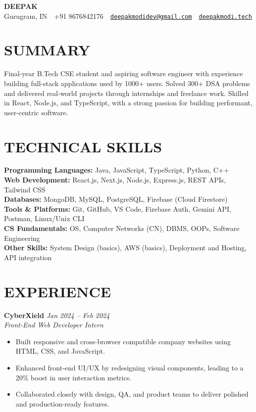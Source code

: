 \documentclass[a4paper,11pt]{article}
\begin{document}
\small
\begin{center}
    {\huge \textbf{DEEPAK}} \\
    \vspace{6pt}
    Gurugram, IN~\textbar~+91 8676842176~\textbar~\href{mailto:deepakmodidev@gmail.com}{\nolinkurl{deepakmodidev@gmail.com}}~\textbar~\href{https://deepakmodi.tech}{\texttt{deepakmodi.tech}}
\end{center}

\section*{SUMMARY}
Final-year B.Tech CSE student and aspiring software engineer with experience building full-stack applications used by 1000+ users. Solved 300+ DSA problems and delivered real-world projects through internships and freelance work. Skilled in React, Node.js, and TypeScript, with a strong passion for building performant, user-centric software.

\section*{TECHNICAL SKILLS}
\textbf{Programming Languages:} Java, JavaScript, TypeScript, Python, C++ \\
\textbf{Web Development:} React.js, Next.js, Node.js, Express.js, REST APIs, Tailwind CSS \\
\textbf{Databases:} MongoDB, MySQL, PostgreSQL, Firebase (Cloud Firestore) \\
\textbf{Tools \& Platforms:} Git, GitHub, VS Code, Firebase Auth, Gemini API, Postman, Linux/Unix CLI \\
\textbf{CS Fundamentals:} OS, Computer Networks (CN), DBMS, OOPs, Software Engineering \\
\textbf{Other Skills:} System Design (basics), AWS (basics), Deployment and Hosting, API integration

\section*{EXPERIENCE}
\textbf{CyberXield} \hfill \textit{Jan 2024 -- Feb 2024} \\
\textit{Front-End Web Developer Intern}
\begin{itemize}
    \item Built responsive and cross-browser compatible company websites using HTML, CSS, and JavaScript.
    \item Enhanced front-end UI/UX by redesigning visual components, leading to a 20\% boost in user interaction metrics.
    \item Collaborated closely with design, QA, and product teams to deliver polished and production-ready features.
\end{itemize}
\end{document}
